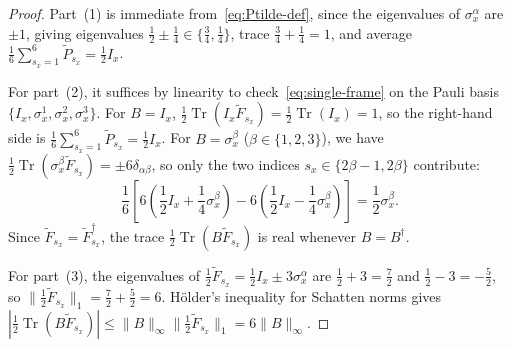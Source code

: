 \documentclass[11pt,a4paper]{article}
\numberwithin{equation}{section}
\theoremstyle{plain}
\theoremstyle{definition}
\newcommand{\Tr}{\operatorname{Tr}}
\begin{document}
\begin{proof}
Part~(1) is immediate from~\eqref{eq:Ptilde-def}, since the eigenvalues of $\sigma_x^\alpha$ are $\pm 1$, giving eigenvalues $\frac{1}{2}\pm\frac{1}{4}\in\{\frac{3}{4},\frac{1}{4}\}$, trace $\frac{3}{4}+\frac{1}{4}=1$, and average $\frac{1}{6}\sum_{s_x=1}^6 \widetilde{P}_{s_x} = \frac{1}{2}I_x$.

For part~(2), it suffices by linearity to check~\eqref{eq:single-frame} on the Pauli basis $\{I_x,\sigma_x^1,\sigma_x^2,\sigma_x^3\}$. For $B = I_x$, $\frac{1}{2}\Tr(I_x\widetilde{F}_{s_x}) = \frac{1}{2}\Tr(I_x) = 1$, so the right-hand side is $\frac{1}{6}\sum_{s_x=1}^6 \widetilde{P}_{s_x} = \frac{1}{2}I_x$. For $B = \sigma_x^\beta$ ($\beta\in\{1,2,3\}$), we have $\frac{1}{2}\Tr(\sigma_x^\beta\widetilde{F}_{s_x}) = \pm 6\delta_{\alpha\beta}$, so only the two indices $s_x\in\{2\beta-1, 2\beta\}$ contribute:
\[
  \frac{1}{6}\left[6\left(\frac{1}{2}I_x + \frac{1}{4}\sigma_x^\beta\right) - 6\left(\frac{1}{2}I_x - \frac{1}{4}\sigma_x^\beta\right)\right]
  = \frac{1}{2}\sigma_x^\beta.
\]
Since $\widetilde{F}_{s_x} = \widetilde{F}_{s_x}^\dagger$, the trace $\frac{1}{2}\Tr(B\widetilde{F}_{s_x})$ is real whenever $B = B^\dagger$.

For part~(3), the eigenvalues of $\frac{1}{2}\widetilde{F}_{s_x} = \frac{1}{2}I_x \pm 3\sigma_x^\alpha$ are $\frac{1}{2}+3 = \frac{7}{2}$ and $\frac{1}{2}-3 = -\frac{5}{2}$, so $\|\frac{1}{2}\widetilde{F}_{s_x}\|_1 = \frac{7}{2}+\frac{5}{2} = 6$. H\"older's inequality for Schatten norms gives $|\frac{1}{2}\Tr(B\widetilde{F}_{s_x})| \le \|B\|_\infty\|\frac{1}{2}\widetilde{F}_{s_x}\|_1 = 6\|B\|_\infty$.
\end{proof}
\end{document}
